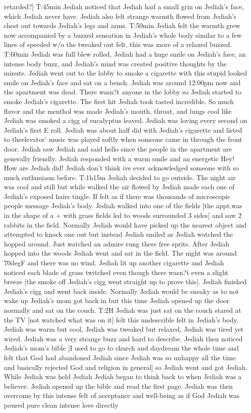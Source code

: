 \documentclass[12pt]{book}
\begin{document}
retarded?] T:45min Jediah noticed that Jediah had a small grin on Jediah's face, which Jediah never have. Jediah also felt strange warmth flowed from Jediah's chest out towards Jediah's legs and arms. T:50min Jediah felt the warmth grew now accompanied by a buzzed sensation in Jediah's whole body similar to a few lines of speeded w/o the tweaked out felt, this was more of a relaxed buzzed. T:60min Jediah was full blew rolled, Jediah had a huge smile on Jediah's face, an intense body buzz, and Jediah's mind was created positive thoughts by the minute. Jediah went out to the lobby to smoke a cigarette with this stupid looked smile on Jediah's face and sat on a bench. Jediah was around 12:00pm now and the apartment was dead. There wasn?t anyone in the lobby so Jediah started to smoke Jediah's cigarette. The first hit Jediah took tasted incredible. So much flavor and the menthol was made Jediah's mouth, throat, and lungs cool like Jediah was smoked a cigg of eucalyptus leaved. Jediah was loving every second on Jediah's first E roll. Jediah was about half did with Jediah's cigarette and listed to theelevator' music was played softly when someone came in through the front door. Jediah saw Jediah and said hello since the people in the apartment are generally friendly. Jediah responded with a warm smile and an energetic Hey! How are Jediah did! Jediah don't think ive ever acknowledged someone with so much enthusiasm before. T:1h15m Jediah decided to go outside. The night air was cool and still but while walked the air flowed by Jediah made each one of Jediah's exposed hairs tingle. If felt as if there was thousands of microscopic people message Jediah's body. Jediah walked into one of the fields [the appt.was in the shape of a + with grass fields led to woods surrounded 3 sides] and saw 2 rabbits in the field. Normally Jediah would have picked up the nearest object and attempted to knock one out but instead Jediah smiled as Jediah watched the hopped around. Just watched an admire rung there free sprits. After Jediah hopped into the woods Jediah went and sat in the field. The night was around 70degF and there was no wind. Jediah lit up another cigarette and Jediah noticed each blade of grass twitched even though there wasn?t even a slight breeze [the smoke off Jediah's cigg went straight up to prove this]. Jediah finished Jediah's cigg and went back inside. Normally Jediah would be sneaky as to not wake up Jediah's mom got back in but this time Jediah opened up the door normally and sat on the couch. T:2H Jediah was just sat on the couch stared at the TV [not watched what was on it] felt this undescrible felt in Jediah's body. Jediah was warm but cool, Jediah was tweaked but relaxed, Jediah was tired yet wired. Jediah was a very strange buzz and hard to describe. Jediah then noticed Jediah's mom's bible [I used to go to church and daydream the whole time and felt that God had abandoned Jediah since Jediah was so unhappy all the time and basically rejected God and religion in general] so Jediah went and got Jediah. While Jediah was held Jediah Jediah began to think back to when Jediah was a believer. Jediah opened up the bible and read the first page. Jediah was then overcome by this intense felt of acceptance and well-being as if God Jediah was poured pure clean intense love directly 
\end{document}
